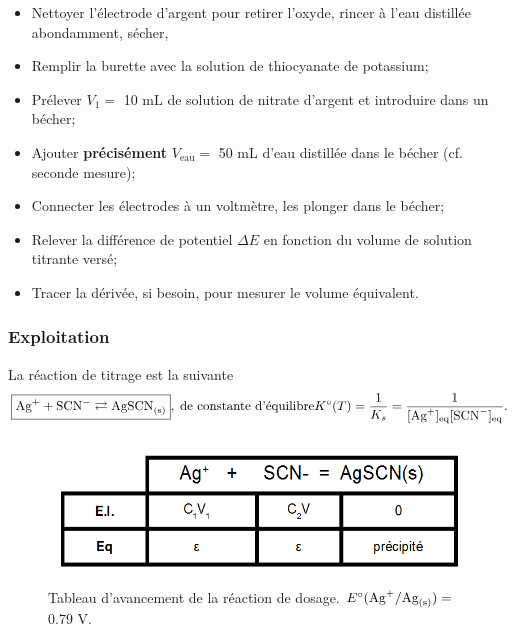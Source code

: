 \documentclass[11pt,a4paper]{report}
\begin{document}
\begin{itemize}
	\item Nettoyer l'électrode d'argent pour retirer l'oxyde, rincer à l'eau distillée abondamment, 				sécher,
	\item Remplir la burette avec la solution de thiocyanate de potassium;
	\item Prélever $V_1 =$ 10 mL de solution de nitrate d'argent et introduire dans un bécher;
	\item Ajouter \textbf{précisément} $V_\text{eau} =$ 50 mL d'eau distillée dans le bécher (cf. seconde mesure);
	\item Connecter les électrodes à un voltmètre, les plonger dans le bécher;
	\item Relever la différence de potentiel $\Delta E$ en fonction du volume de solution titrante versé;
	\item Tracer la dérivée, si besoin, pour mesurer le volume équivalent.
	
\end{itemize}
\subsubsection*{Exploitation}
La réaction de titrage est la suivante
\begin{equation}
	\boxed{\text{Ag}^+ + \text{SCN}^- \rightleftarrows \text{AgSCN}_\text{(s)}},\;
	\text{de constante d'équilibre} K\degree(T) = \frac{1}{K_s} = \frac{1}{[\text{Ag}^+]_\text{eq}				[\text{SCN}^-]_\text{eq}}.
\end{equation}

	\begin{figure}[h!]
		\begin{center}
			\includegraphics[scale = 0.4]{AgSCN.png}
		\end{center}
		\caption{Tableau d'avancement de la réaction de dosage. 
		$E\degree(\text{Ag}^+/\text{Ag}_\text{(s)}) =$ 0.79 V. }
	\end{figure}
	
\end{document}

